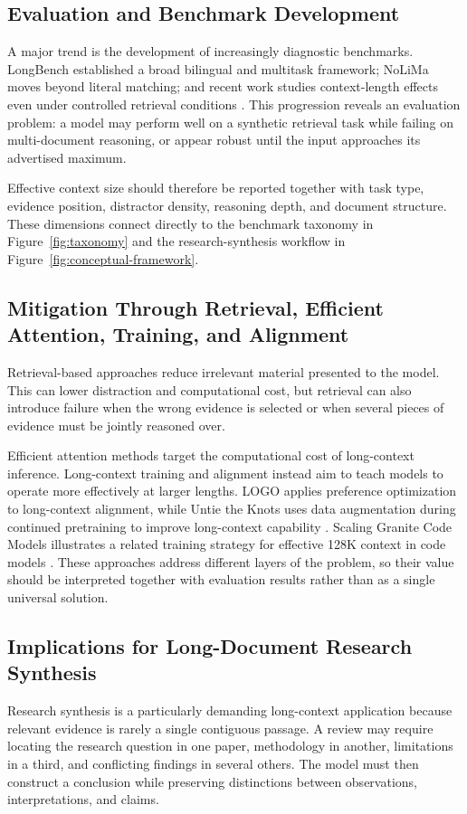 \documentclass[manuscript,screen,oneside]{acmart}
\begin{document}
\subsection{Evaluation and Benchmark Development}\label{sec:evaluation}
A major trend is the development of increasingly diagnostic benchmarks. LongBench established a broad bilingual and multitask framework; NoLiMa moves beyond literal matching; and recent work studies context-length effects even under controlled retrieval conditions \cite{bai2024longbench,modarressi2025nolima,du2025contextlength}. This progression reveals an evaluation problem: a model may perform well on a synthetic retrieval task while failing on multi-document reasoning, or appear robust until the input approaches its advertised maximum.

Effective context size should therefore be reported together with task type, evidence position, distractor density, reasoning depth, and document structure. These dimensions connect directly to the benchmark taxonomy in Figure~\ref{fig:taxonomy} and the research-synthesis workflow in Figure~\ref{fig:conceptual-framework}.

\subsection{Mitigation Through Retrieval, Efficient Attention, Training, and Alignment}\label{sec:mitigation}
Retrieval-based approaches reduce irrelevant material presented to the model. This can lower distraction and computational cost, but retrieval can also introduce failure when the wrong evidence is selected or when several pieces of evidence must be jointly reasoned over.

Efficient attention methods target the computational cost of long-context inference. Long-context training and alignment instead aim to teach models to operate more effectively at larger lengths. LOGO applies preference optimization to long-context alignment, while Untie the Knots uses data augmentation during continued pretraining to improve long-context capability \cite{tang2025logo,tian2025untie}. Scaling Granite Code Models illustrates a related training strategy for effective 128K context in code models \cite{stallone2024granite}. These approaches address different layers of the problem, so their value should be interpreted together with evaluation results rather than as a single universal solution.

\subsection{Implications for Long-Document Research Synthesis}\label{sec:implications}
Research synthesis is a particularly demanding long-context application because relevant evidence is rarely a single contiguous passage. A review may require locating the research question in one paper, methodology in another, limitations in a third, and conflicting findings in several others. The model must then construct a conclusion while preserving distinctions between observations, interpretations, and claims.
\end{document}
